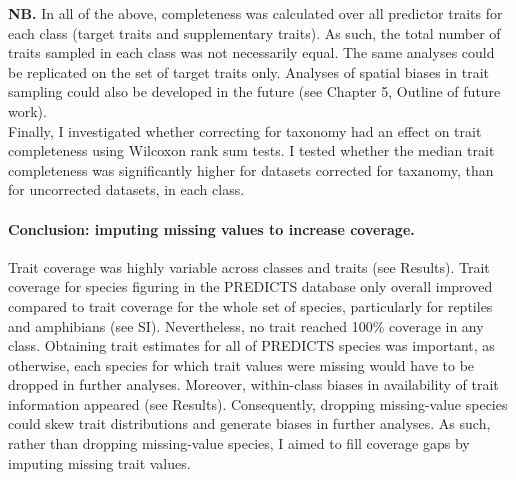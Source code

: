 \textbf{NB.} In all of the above, completeness was calculated over all predictor traits for each class (target traits and supplementary traits). As such, the total number of traits sampled in each class was not necessarily equal. The same analyses could be replicated on the set of target traits only. Analyses of spatial biases in trait sampling could also be developed in the future (see Chapter 5, Outline of future work).\\

Finally, I investigated whether correcting for taxonomy had an effect on trait completeness using Wilcoxon rank sum tests. I tested whether the median trait completeness was significantly higher for datasets corrected for taxanomy, than for uncorrected datasets, in each class.

\paragraph{Conclusion: imputing missing values to increase coverage.}
Trait coverage was highly variable across classes and traits (see Results). Trait coverage for species figuring in the PREDICTS database only overall improved compared to trait coverage for the whole set of species, particularly for reptiles and amphibians (see SI). Nevertheless, no trait reached 100\% coverage in any class. Obtaining trait estimates for all of PREDICTS species was important, as otherwise, each species for which trait values were missing would have to be dropped in further analyses. Moreover, within-class biases in availability of trait information appeared (see Results). Consequently, dropping missing-value species could skew trait distributions and generate biases in further analyses. As such, rather than dropping missing-value species, I aimed to fill coverage gaps by imputing missing trait values. 

